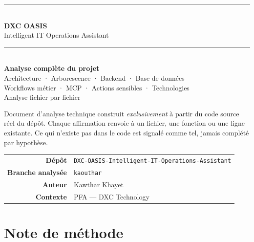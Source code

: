 \documentclass[11pt,a4paper]{report}
\newcommand{\file}[1]{\texttt{\small #1}}
\begin{document}
\begin{titlepage}
\centering
\vspace*{2cm}

{\color{oasisblue}\rule{\textwidth}{2pt}}\\[6mm]

{\Huge\bfseries\color{oasisdark} DXC OASIS}\\[3mm]
{\LARGE\color{oasisgrey} Intelligent IT Operations Assistant}\\[6mm]

{\color{oasisblue}\rule{\textwidth}{2pt}}\\[16mm]

{\Large\bfseries Analyse complète du projet}\\[4mm]
{\large\color{oasisgrey}
Architecture · Arborescence · Backend · Base de données\\
Workflows métier · MCP · Actions sensibles · Technologies\\
Analyse fichier par fichier}\\[20mm]

\begin{minipage}{0.8\textwidth}
\centering\small\color{oasisgrey}
Document d'analyse technique construit \emph{exclusivement} à partir du code
source réel du dépôt. Chaque affirmation renvoie à un fichier, une fonction ou
une ligne existante. Ce qui n'existe pas dans le code est signalé comme tel,
jamais complété par hypothèse.
\end{minipage}

\vfill

\begin{tabular}{rl}
\textbf{Dépôt} & \file{DXC-OASIS-Intelligent-IT-Operations-Assistant}\\
\textbf{Branche analysée} & \file{kaouthar}\\
\textbf{Auteur} & Kawthar Khayet\\
\textbf{Contexte} & PFA --- DXC Technology\\
\end{tabular}

\vspace{1cm}
\end{titlepage}

\chapter*{Note de méthode}
\end{document}
